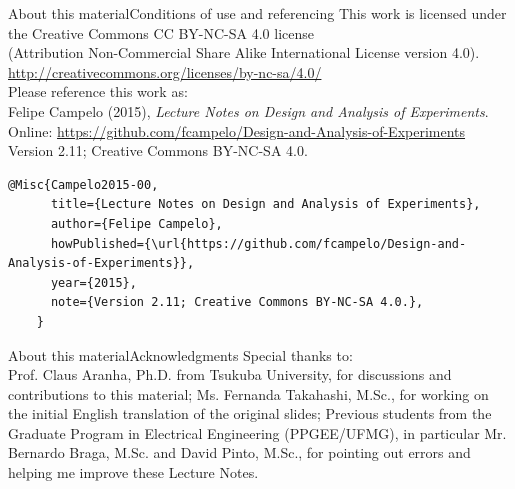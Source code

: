 \documentclass[t]{beamer}
\begin{document}
\begin{ftstf}{About this material}{Conditions of use and referencing}
\centering\footnotesize This work is licensed under the Creative Commons CC BY-NC-SA 4.0 license\\(Attribution Non-Commercial Share Alike International License version 4.0).\\
\vhalf
\url{http://creativecommons.org/licenses/by-nc-sa/4.0/}\\
\vone
\footnotesize Please reference this work as:\\
\footnotesize \flushleft Felipe Campelo (2015), \textit{Lecture Notes on Design and Analysis of Experiments}.\\Online: {\scriptsize\url{https://github.com/fcampelo/Design-and-Analysis-of-Experiments}}\\
Version 2.11; Creative Commons BY-NC-SA 4.0.\\

\begin{Verbatim}[fontsize=\tiny]
    @Misc{Campelo2015-00,
      title={Lecture Notes on Design and Analysis of Experiments},
      author={Felipe Campelo},
      howPublished={\url{https://github.com/fcampelo/Design-and-Analysis-of-Experiments}},
      year={2015},
      note={Version 2.11; Creative Commons BY-NC-SA 4.0.},
    }
\end{Verbatim}

\end{ftstf}


\begin{ftst}{About this material}{Acknowledgments}
\footnotesize Special thanks to:\\
\vhalf
\bitems Prof. Claus Aranha, Ph.D. from Tsukuba University, for discussions and contributions to this material;
\spitem Ms. Fernanda Takahashi, M.Sc., for working on the initial English translation of the original slides;
\spitem Previous students from the Graduate Program in Electrical Engineering (PPGEE/UFMG), in particular Mr. Bernardo Braga, M.Sc. and David Pinto, M.Sc., for pointing out errors and helping me improve these Lecture Notes.
\eitem
\end{ftst}
\end{document}
